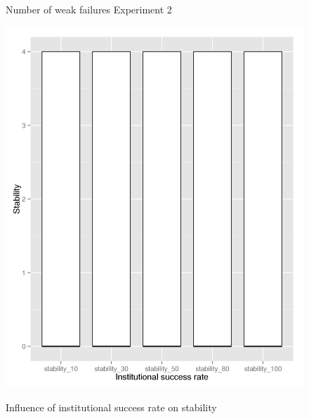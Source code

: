 \documentclass[a4paper]{article}
\begin{document}
\begin{figure}[!ht]
\caption{Number of weak failures Experiment 2}
\label{b_weak}
\end{figure}

\begin{figure}[!ht]
\centering
\includegraphics[width =0.5 \textwidth]{stability_b.jpg}
\label{inst_stability}
\caption{Influence of institutional success rate on stability}
\end{figure}
\end{document}
